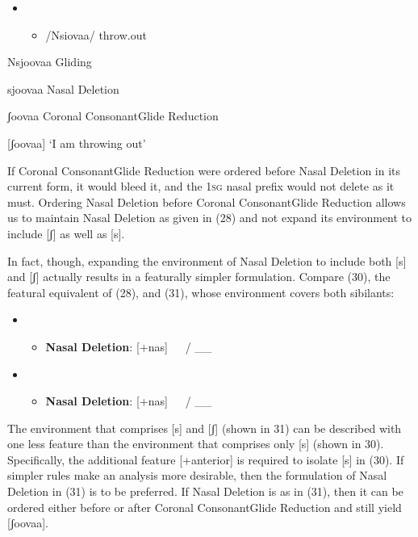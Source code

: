 \documentclass[output=paper]{langsci/langscibook}
\begin{document}
\begin{itemize}
\item \setcounter{itemize}{0}
\begin{itemize}
\item /Nsiovaa/  throw.out

\end{itemize}
\end{itemize}

Nsjoovaa  Gliding

sjoovaa   Nasal Deletion

ʃoovaa  Coronal ConsonantGlide Reduction

[ʃoovaa]  ‘I am throwing out’

If Coronal ConsonantGlide Reduction were ordered before Nasal Deletion in its current form, it would bleed it, and the 1\textsc{sg} nasal prefix would not delete as it must. Ordering Nasal Deletion before Coronal ConsonantGlide Reduction allows us to maintain Nasal Deletion as given in (28) and not expand its environment to include [ʃ] as well as [s]. 

In fact, though, expanding the environment of Nasal Deletion to include both [s] and [ʃ] actually results in a featurally simpler formulation. Compare (30), the featural equivalent of (28), and (31), whose environment covers both sibilants:

\begin{itemize}
\item \setcounter{itemize}{0}
\begin{itemize}
\item \textbf{Nasal Deletion}: [+nas]   / \_\_ 

\end{itemize}
\end{itemize}
\begin{itemize}
\item \setcounter{itemize}{0}
\begin{itemize}
\item \textbf{Nasal Deletion}: [+nas]   / \_\_ 

\end{itemize}
\end{itemize}

The environment that comprises [s] and [ʃ] (shown in 31) can be described with one less feature than the environment that comprises only [s] (shown in 30). Specifically, the additional feature [+anterior] is required to isolate [s] in (30). If simpler rules make an analysis more desirable, then the formulation of Nasal Deletion in (31) is to be preferred. If Nasal Deletion is as in (31), then it can be ordered either before or after Coronal ConsonantGlide Reduction and still yield [ʃoovaa]. 
\end{document}
